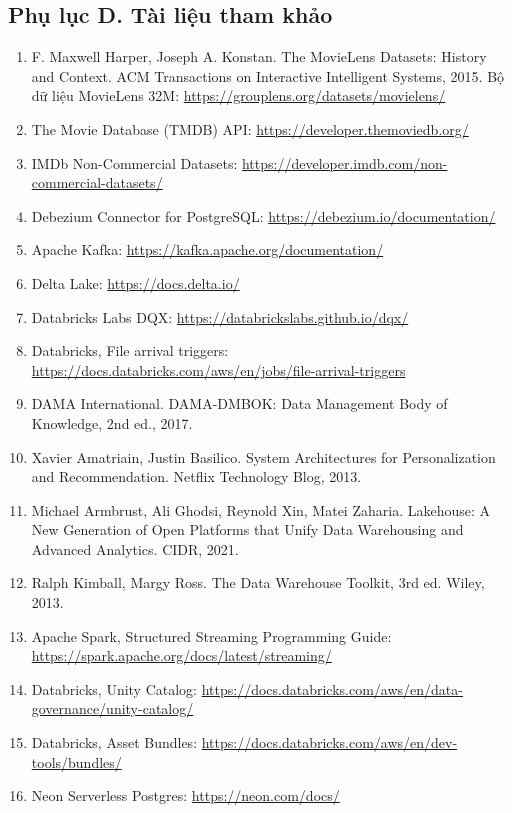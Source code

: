 \documentclass[a4paper,11pt]{article}
\begin{document}
\subsection*{Phụ lục D. Tài liệu tham khảo}

\begin{enumerate}
  \item F. Maxwell Harper, Joseph A. Konstan. The MovieLens Datasets: History and Context. ACM Transactions on Interactive Intelligent Systems, 2015. Bộ dữ liệu MovieLens 32M: \url{https://grouplens.org/datasets/movielens/}
  \item The Movie Database (TMDB) API: \url{https://developer.themoviedb.org/}
  \item IMDb Non-Commercial Datasets: \url{https://developer.imdb.com/non-commercial-datasets/}
  \item Debezium Connector for PostgreSQL: \url{https://debezium.io/documentation/}
  \item Apache Kafka: \url{https://kafka.apache.org/documentation/}
  \item Delta Lake: \url{https://docs.delta.io/}
  \item Databricks Labs DQX: \url{https://databrickslabs.github.io/dqx/}
  \item Databricks, File arrival triggers: \url{https://docs.databricks.com/aws/en/jobs/file-arrival-triggers}
  \item DAMA International. DAMA-DMBOK: Data Management Body of Knowledge, 2nd ed., 2017.
  \item Xavier Amatriain, Justin Basilico. System Architectures for Personalization and Recommendation. Netflix Technology Blog, 2013.
  \item Michael Armbrust, Ali Ghodsi, Reynold Xin, Matei Zaharia. Lakehouse: A New Generation of Open Platforms that Unify Data Warehousing and Advanced Analytics. CIDR, 2021.
  \item Ralph Kimball, Margy Ross. The Data Warehouse Toolkit, 3rd ed. Wiley, 2013.
  \item Apache Spark, Structured Streaming Programming Guide: \url{https://spark.apache.org/docs/latest/streaming/}
  \item Databricks, Unity Catalog: \url{https://docs.databricks.com/aws/en/data-governance/unity-catalog/}
  \item Databricks, Asset Bundles: \url{https://docs.databricks.com/aws/en/dev-tools/bundles/}
  \item Neon Serverless Postgres: \url{https://neon.com/docs/}
\end{enumerate}
\end{document}
